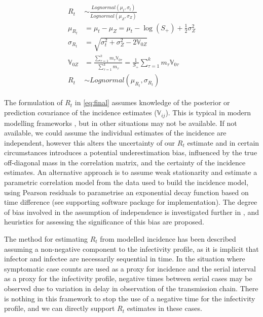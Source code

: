 \documentclass[10pt,letterpaper]{article}
\begin{document}
\begin{eqnarray}
\label{eq:final}
\begin{aligned}
R_t &\sim \frac{Lognormal(\mu_t,\sigma_t)}
{Lognormal( \mu_{Z}, \sigma_{Z})} \\
\mu_{R_t} &= \mu_t - \mu_{Z} = \mu_t - \log(S_+) + \frac{1}{2}\sigma_{Z}^2\\
\sigma_{R_t} &= \sqrt{\sigma_t^2+\sigma_{Z}^2 - 2 \mathbb{V}_{0Z}} \\
\mathbb{V}_{0Z} &= \frac{\sum_{\tau=1}^k m_\tau \mathbb{V}_{0\tau}}{\sum_{\tau=1}^k m_\tau} = \frac{1}{S_+}\sum_{\tau=1}^k m_\tau \mathbb{V}_{0\tau}\\
R_t &\sim Lognormal(\mu_{R_t}, \sigma_{R_t})
\end{aligned}
\end{eqnarray}

The formulation of $R_t$ in \eqref{eq:final} assumes knowledge of the posterior or prediction covariance of the incidence estimates ($\mathbb{V}_{ij}$). This is typical in modern modelling frameworks \cite{hastie2017,rue2009}, but in other situations may not be available. If not available, we could assume the individual estimates of the incidence are independent, however this alters the uncertainty of our $R_t$ estimate and in certain circumstances introduces a potential underestimation bias, influenced by the true off-diagonal mass in the correlation matrix, and the certainty of the incidence estimates. An alternative approach is to assume weak stationarity and estimate a parametric correlation model from the data used to build the incidence model, using Pearson residuals to parametrise an exponential decay function based on time difference \cite{wood2017} (see supporting software package for implementation). The degree of bias involved in the assumption of independence is investigated further in , and heuristics for assessing the significance of this bias are proposed.

The method for estimating $R_t$ from modelled incidence has been described assuming a non-negative component to the infectivity profile, as it is implicit that infector and infectee are necessarily sequential in time. In the situation where symptomatic case counts are used as a proxy for incidence and the serial interval as a proxy for the infectivity profile, negative times between serial cases may be observed due to variation in delay in observation of the transmission chain. There is nothing in this framework to stop the use of a negative time for the infectivity profile, and we can directly support $R_t$ estimates in these cases.
\end{document}
